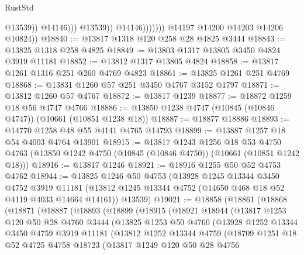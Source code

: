 \begin{lexlean}{RustStd}
\begin{coremodule}
                                    @13539))
                                @14146)))
                          @13539))
                      @14146)))))))
        @14197
        @14200
        @14203
        @14206
        @10824))
@18840 := @13817 @1318 @120 @258 @28 @4825 @3444
@18843 := @13825 @1318 @258 @4825
@18849 := @13803 @1317 @13805 @3450 @4824 @3919 @11181
@18852 := @13812 @1317 @13805 @4824
@18858 := @13817 @1261 @1316 @251 @260 @4769 @4823
@18861 := @13825 @1261 @251 @4769
@18868 := @13831 @1260 @57 @251 @3450 @4767 @3152 @1797
@18871 := @13812 @1260 @57 @4767
@18872 := @13817 @1239
@18877 := @18872 @1259 @18 @56 @4747 @4766
@18886 := @13850 @1238 @4747 (@10845 (@10846 @4747)) (@10661 (@10851 @1238 @18))
@18887 := @18877 @18886
@18893 := @14770 @1258 @48 @55 @4141 @4765 @14793
@18899 := @13887 @1257 @18 @54 @4003 @4764 @13901
@18915 := @13817
    @1243
    @1256
    @18
    @53
    @4750
    @4763
    (@13850 @1242 @4750 (@10845 (@10846 @4750)) (@10661 (@10851 @1242 @18)))
@18916 := @13817 @1246
@18921 := @18916 @1255 @50 @52 @4753 @4762
@18944 := @13825
    @1246
    @50
    @4753
    (@13928
      @1245
      @13344
      @3450
      @4752
      @3919
      @11181
      (@13812 @1245 @13344 @4752 (@14650 @468 @18 @52 @4119 @4033 @14664 @14161))
      @13539)
@19021 := @18858
    (@18861
      (@18868
        (@18871
          (@18887
            (@18893
              (@18899
                (@18915
                  (@18921
                    @18944
                    (@13817
                      @1253
                      @120
                      @50
                      @28
                      @4760
                      @3444
                      (@13825
                        @1253
                        @50
                        @4760
                        (@13928
                          @1252
                          @13344
                          @3450
                          @4759
                          @3919
                          @11181
                          (@13812
                            @1252
                            @13344
                            @4759
                            (@18709
                              @1251
                              @18
                              @52
                              @4725
                              @4758
                              @18723
                              (@13817
                                @1249
                                @120
                                @50
                                @28
                                @4756

\end{coremodule}
\end{lexlean}
